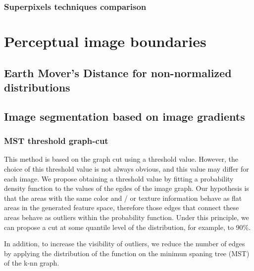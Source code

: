 \subsubsection{Superpixels techniques comparison}

\section{Perceptual image boundaries}
\subsection{Earth Mover's Distance for non-normalized distributions}

\subsection{Image segmentation based on image gradients}
\subsubsection{MST threshold graph-cut}
This method is based on the graph cut using a threshold value. However, the choice of this threshold value is not always obvious, and this value may differ for each image.
We propose obtaining a threshold value by fitting a probability density function to the values of the egdes of the image graph. Our hypothesis is that the areas with the same color and / or texture information behave as flat areas in the generated feature space, therefore those edges that connect these areas behave as outliers within the probability function. Under this principle, we can propose a cut at some quantile level of the distribution, for example, to 90\%.

In addition, to increase the visibility of outliers, we reduce the number of edges by applying the distribution of the function on the minimun spaning tree (MST) of the k-nn graph.

%


